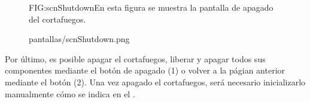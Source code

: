 \begin{figure}[Pantalla de apagado del cortafuegos]{FIG:scnShutdown}{En esta figura se muestra la pantalla de apagado del cortafuegos.}
  \begin{image}{}{}{pantallas/scnShutdown.png}
  \end{image}
\end{figure}

Por último, es posible apagar el cortafuegos, liberar y apagar todos sus componentes mediante el botón de apagado (1) o volver a la págian anterior mediante el botón (2). Una vez apagado el cortafuegos, será necesario inicializarlo manualmente cómo se indica en el .